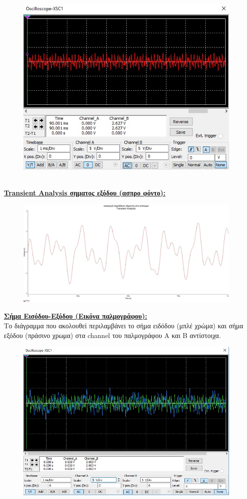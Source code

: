 \documentclass{article}
\begin{document}
{{{\begin{figure}[h!]
  \includegraphics[width=120mm,scale=2]{thema4/mu3.jpg}
\end{figure} \\
\textbf{\underline{Transient Analysis σηματος εξόδου (ασπρο φόντο):}}
\begin{figure}[h!]
\centering
 	\advance\leftskip-1cm
  \includegraphics[width=120mm,scale=2]{thema4/mu4.jpg}
\end{figure} 
 \clearpage
 \textbf{\underline{Σήμα Εισόδου-Εξόδου (Εικόνα παλμογράφου):}} 
 \\[1.4\baselineskip]
 Το διάγραμμα που ακολουθεί περιλαμβάνει το σήμα ειδόδου (μπλέ χρώμα) και σήμα εξόδου (πράσινο χρωμα) στα channel του παλμογράφου Α και Β αντίστοιχα.  \\[0.4\baselineskip]
 \begin{figure}[h!]
\centering
 	\advance\leftskip-1cm
  \includegraphics[width=140mm,scale=2]{thema4/mu5.jpg}

\end{figure}}}}
\end{document}

